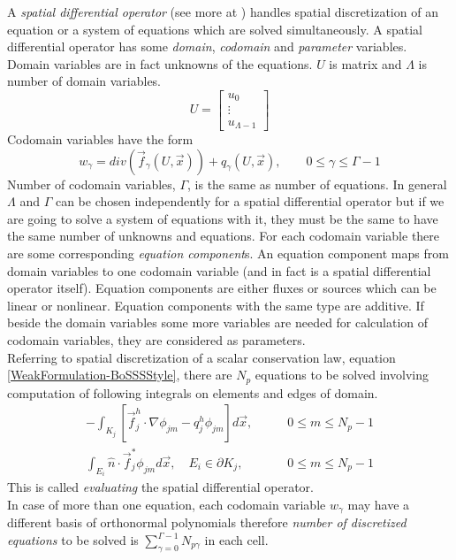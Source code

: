 \documentclass[emamy.tex]{subfiles}
\begin{document}
A \emph{spatial differential operator} (see more at \cite{KummerLayer2Manual09}) handles spatial discretization of an equation or a system of equations which are solved simultaneously. A spatial differential operator has some \emph{domain}, \emph{codomain} and \emph{parameter} variables. Domain variables are in fact unknowns of the equations. $U$ is matrix and $\Lambda$ is number of domain variables.
\[
U=\begin{bmatrix}
    u_0\\
    \vdots\\
    u_{\Lambda-1}
  \end{bmatrix}
\]
Codomain variables have the form
\[
w_{\gamma}=div(\vec{f}_{\gamma}(U,\vec{x}))+q_{\gamma}(U,\vec{x}), \qquad 0\leq \gamma \leq \Gamma-1
\]
Number of codomain variables, $\Gamma$, is the same as number of equations. In general $\Lambda$ and $\Gamma$ can be  chosen independently for a spatial differential operator but if we are going to solve a system of equations with it, they must be the same to have the same number of unknowns and equations. For each codomain variable there are some corresponding \emph{equation component}s. An equation component maps from domain variables to one codomain variable (and in fact is a spatial differential operator itself). Equation components are either fluxes or sources which can be linear or nonlinear. Equation components with the same type are additive. If beside the domain variables some more variables are needed for calculation of codomain variables, they are considered as parameters.\\ Referring to spatial discretization of a scalar conservation law, equation \eqref{WeakFormulation-BoSSSStyle}, there are $N_p$ equations to be solved involving computation of following integrals on elements and edges of domain.
\begin{align}
\label{QuadratureVolumeIntegral}
-\int_{K_j} [\vec{f}_j^h\cdot \nabla \phi_{jm} - q_j^h \phi_{jm}] d\vec{x}, &\qquad 0\leq m \leq N_p-1\\
\label{QuadratureEdgeIntegral}
\int_{E_i} \hat{n}\cdot \vec{f}_j^* \phi_{jm} d\vec{x}, \quad E_i \in \partial K_j, &\qquad 0\leq m \leq N_p-1
\end{align}
This is called \emph{evaluating} the spatial differential operator.\\
In case of more than one equation, each codomain variable $w_\gamma$ may have a different basis of orthonormal polynomials therefore \emph{number of discretized equations} to be solved is $\sum_{\gamma=0}^{\Gamma-1} N_{p \gamma}$ in each cell.
\end{document}
